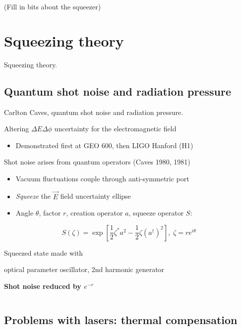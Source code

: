 

    (Fill in bits about the squeezer)

    \section{Squeezing theory}
    \label{squeezing_theory}

        Squeezing theory.

        \subsection{Quantum shot noise and radiation pressure}
        \label{quantum_noise}

            Carlton Caves, quantum shot noise and radiation pressure.


Altering $\Delta E\Delta\phi$ uncertainty for the electromagnetic
field
\begin{itemize}
\item Demonstrated first at GEO 600, then LIGO Hanford (H1)\end{itemize}
\begin{theorem}
Shot noise arises from quantum operators (Caves 1980, 1981)\end{theorem}
\begin{itemize}
\item Vacuum fluctuations couple through anti-symmetric port
\item \emph{Squeeze }the $\overrightarrow{E}$ field uncertainty ellipse
\item Angle $\theta$, factor $r$, creation operator $a$, squeeze operator
$S$:
\end{itemize}

\[
S(\zeta)=\exp[\frac{1}{2}\zeta^{*}a^{2}-\frac{1}{2}\zeta(a^{\dagger})^{2}],\;\zeta=re^{i\theta}
\]



Squeezed state made with


optical parameter oscillator, 2nd harmonic generator


\textbf{Shot noise reduced by $e^{-r}$}


\[
\]




        \subsection{Problems with lasers: thermal compensation}
        \label{TCS}


